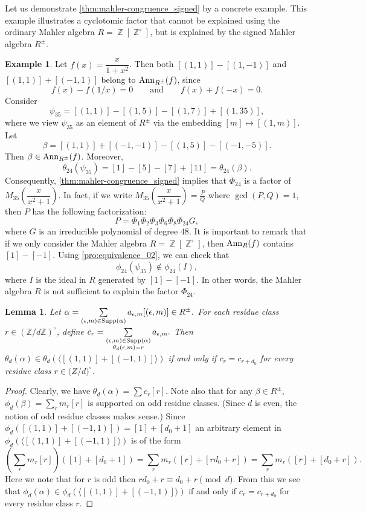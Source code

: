 \documentclass[12t,a4paper]{amsart}
\newtheorem{lem}[thm]{Lemma}
\theoremstyle{definition}
\newtheorem{expl}[thm]{Example}
\DeclareMathOperator{\Z}{\mathbb{Z}}
\DeclareMathOperator{\supp}{{\rm Supp}}
\newcommand{\Ann}{{\rm Ann}}
\numberwithin{equation}{section}
\begin{document}
{{Let us demonstrate \cref{thm:mahler-congruence_signed} by a concrete example. This example illustrates a cyclotomic factor that cannot be explained using the ordinary Mahler algebra $R=\Z[\Z^\circ]$, but is explained by the signed Mahler algebra $R^\pm$.



\begin{expl}
Let \(f(x)=\dfrac{x}{1+x^2}\). Then both $[(1,1)]-[(1,-1)]$ and     $[(1,1)]+[(-1,1)]$ belong to \(\Ann_{R^{\pm}}(f)\), since
\[
    f(x)-f(1/x)=0
    \qquad\text{and}\qquad
    f(x)+f(-x)=0.
\]
Consider
\[
    \psi_{35}=[(1,1)]-[(1,5)]-[(1,7)]+[(1,35)],
\]
where we view \(\psi_{35}\) as an element of \(R^\pm\) via the embedding
\([m]\mapsto [(1,m)]\). Let
\[
    \beta=[(1,1)]+[(-1,-1)]-[(1,5)]-[(-1,-5)].
\]
Then \(\beta\in \Ann_{R^\pm}(f)\). Moreover,
\[
    \theta_{24}(\psi_{35})
    =[1]-[5]-[7]+[11]
    =\theta_{24}(\beta).
\]
Consequently, \cref{thm:mahler-congruence_signed} implies that \(\Phi_{24}\) is a factor of $M_{35}\left(\dfrac{x}{x^2+1}\right).$
In fact, if we write
$M_{35}\left(\dfrac{x}{x^2+1}\right)=\frac{P}{Q}$ where $ \gcd(P,Q)=1$,
then \(P\) has the following factorization: \[P=\Phi_1\Phi_2\Phi_3\Phi_6\Phi_8\Phi_{24}G,\]
where \(G\) is an irreducible polynomial of degree \(48\). It is important to remark that if we
only consider the Mahler algebra \(R=\Z[\Z^\circ]\), then \(\Ann_R(f)\) contains
\([1]-[-1]\). Using \cref{pro:equivalence_02}, we can check that
\[
    \phi_{24}(\psi_{35})\notin \phi_{24}(I),
\]
where \(I\) is the ideal in \(R\) generated by \([1]-[-1]\). In other words, the Mahler algebra
\(R\) is not sufficient to explain the factor \(\Phi_{24}\).
\end{expl}
}

\begin{lem}
Let
\( \alpha=\sum\limits_{(\epsilon,m)\in \supp(\alpha)} a_{\epsilon,m}[(\epsilon,m)]\in R^\pm. \)
For each residue class $r\in (\mathbb Z/d\mathbb Z)^\circ$, define
\(
c_r=\sum\limits_{\substack{(\epsilon,m)\in \supp(\alpha)\\
\theta_d(\epsilon,m)=r}}
a_{\epsilon,m}.
\)
Then
\( \theta_d(\alpha)\in \theta_d(\langle [(1,1)]+[(-1,1)]\rangle) \) 
if and only if
\( c_r=c_{r+d_0} \)
for every residue class $r\in \mathbb (Z/d)^\circ$.
\end{lem}

\begin{proof}
    Clearly, we have $\theta_d(\alpha)=\sum c_r[r]$. Note also that for any $\beta\in R^\pm$, $\phi_d(\beta)= \sum_{r} m_r[r]$ is supported on odd residue classes. (Since $d$ is even, the notion of odd residue classes makes sense.) 
   Since $\phi_d([(1,1)]+[(-1,1)] )=[1]+[d_0+1]$ an arbitrary element in $\phi_d( \langle [(1,1)]+[(-1,1)] \rangle)$ is of the form
       \[
       \left(\sum_{r} m_r [r]\right) ([1] + [d_0+1]) = \sum_{r} m_r ([r] + [rd_0+r]) = \sum_{r} m_r ([r] + [d_0+r]).
       \]
       Here we note that for $r$ is odd then $rd_0+r\equiv d_0+r\pmod d$. 
       From this we see that $\phi_d(\alpha)\in \phi_d(\langle [(1,1)]+[(-1,1)] \rangle)$ if and only if $c_r=c_{r+d_0}$ for every residue class $r$.
\end{proof}

}
\end{document}
